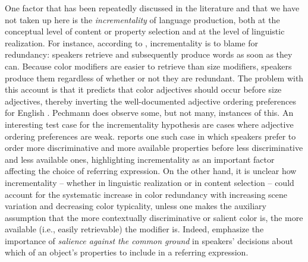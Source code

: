 \documentclass[11pt]{article}
\begin{document}
One factor that has been repeatedly discussed in the literature and that we have not taken up here is the \emph{incrementality} of language production, both at the conceptual level of content or property selection and at the level of linguistic realization. For instance, according to , incrementality is to blame for redundancy: speakers retrieve and subsequently produce words as soon as they can. Because color modifiers are easier to retrieve than size modifiers, speakers produce them regardless of whether or not they are redundant. The problem with this account is that it predicts that color adjectives should occur before size adjectives, thereby inverting the well-documented adjective ordering preferences for English \cite{bloomfield1933,sproat1991,scontras2017}. Pechmann does observe some, but not many, instances of this. An interesting test case for the incrementality hypothesis are cases where adjective ordering preferences are weak.  reports one such case in which speakers prefer to order more discriminative and more available properties before less discriminative and less available ones, highlighting incrementality as an important factor affecting the choice of referring expression. On the other hand, it is unclear how incrementality -- whether in linguistic realization or in content selection -- could account for the systematic increase in color redundancy with increasing scene variation and decreasing color typicality, unless one makes the auxiliary assumption that the more contextually discriminative or salient color is, the more available (i.e., easily retrievable) the modifier is. Indeed,  emphasize the importance of \emph{salience against the common ground} in speakers' decisions about which of an object's properties to include in a referring expression. %
\end{document}
